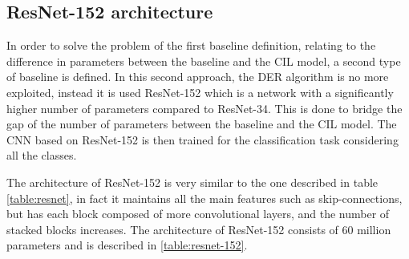 \subsection{ResNet-152 architecture}
\label{sec:method-baseline2}
In order to solve the problem of the first baseline definition, relating to the difference in parameters between the baseline and the CIL model, a second type of baseline is defined.
In this second approach, the DER algorithm is no more exploited, instead it is used ResNet-152 which is a network with a significantly higher number of parameters compared to ResNet-34. This is done to bridge the gap of the number of parameters between the baseline and the CIL model. The CNN based on ResNet-152 is then trained for the classification task considering all the classes.

The architecture of ResNet-152 is very similar to the one described in table \autoref{table:resnet}, in fact it maintains all the main features such as skip-connections, but has each block composed of more convolutional layers, and the number of stacked blocks increases. The architecture of ResNet-152 consists of 60 million parameters and is described in \autoref{table:resnet-152}.


